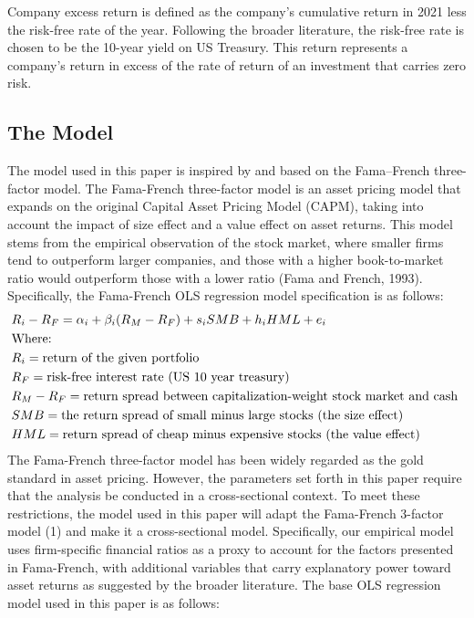 \documentclass[man,natbib,floatsintext]{apa6}
\begin{document}
Company excess return is defined as the company's cumulative return in 2021 less the risk-free rate of the year. Following the broader literature, the risk-free rate is chosen to be the 10-year yield on US Treasury. This return represents a company's return in excess of the rate of return of an investment that carries zero risk. 


\subsection{\textbf{The Model}}
The model used in this paper is inspired by and based on the Fama–French three-factor model. The Fama-French three-factor model is an asset pricing model that expands on the original Capital Asset Pricing Model (CAPM), taking into account the impact of size effect and a value effect on asset returns. This model stems from the empirical observation of the stock market, where smaller firms tend to outperform larger companies, and those with a higher book-to-market ratio would outperform those with a lower ratio (Fama and French, 1993). Specifically, the Fama-French OLS regression model specification is as follows: 
\begin{align}
&R_i-R_F=\alpha_i+\beta_i(R_M-R_F)+s_iSMB+h_iHML+ e_i  \\
&  \text{Where: } \notag \\
& R_i = \text{return of the given portfolio} \notag \\ 
&  R_F= \text{risk-free interest rate (US 10 year treasury)} \notag \\ 
&  R_M- R_F= \text{return spread between capitalization-weight stock market and cash } \notag \\ 
&  SMB = \text{the return spread of small minus large stocks (the size effect)} \notag \\ 
&  HML= \text{return spread of cheap minus expensive stocks (the value effect) } \notag 
\end{align}
The Fama-French three-factor model has been widely regarded as the gold standard in asset pricing. However, the parameters set forth in this paper require that the analysis be conducted in a cross-sectional context. To meet these restrictions, the model used in this paper will adapt the Fama-French 3-factor model (1) and make it a cross-sectional model. Specifically, our empirical model uses firm-specific financial ratios as a proxy to account for the factors presented in Fama-French, with additional variables that carry explanatory power toward asset returns as suggested by the broader literature. The base OLS regression model used in this paper is as follows: 
\end{document}
